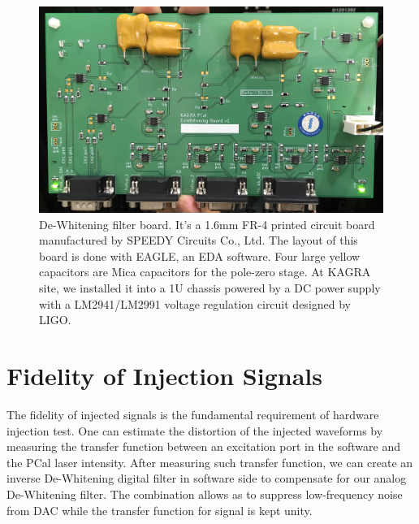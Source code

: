 \begin{figure}[hbt!]
\centering
\includegraphics[width=1\textwidth]{figure/dewPhoto.jpg}
\caption[De-Whitening filter board]{De-Whitening filter board. It's a 1.6mm FR-4 printed circuit board manufactured by SPEEDY Circuits Co., Ltd. The layout of this board is done with EAGLE, an EDA software. Four large yellow capacitors are Mica capacitors for the pole-zero stage. At KAGRA site, we installed it into a 1U chassis powered by a DC power supply with a LM2941/LM2991 voltage regulation circuit designed by LIGO.}
\label{fig:board}
\end{figure}



\pagebreak
\section{Fidelity of Injection Signals}
The fidelity of injected signals is the fundamental requirement of hardware injection test. One can estimate the distortion of the injected waveforms by measuring the transfer function between an excitation port in the software and the PCal laser intensity. After measuring such transfer function, we can create an inverse De-Whitening digital filter in software side to compensate for our analog De-Whitening filter. The combination allows as to suppress low-frequency noise from DAC while the transfer function for signal is kept unity.


